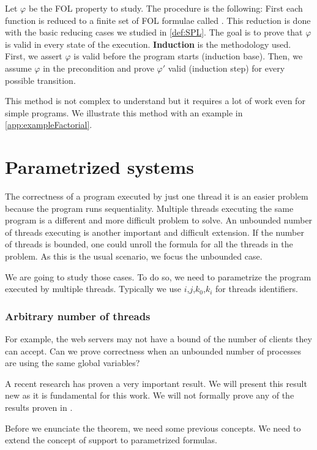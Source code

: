Let $\varphi$ be the \gls{FOL} property to study. 
%
The procedure is the following:
%
First each function is reduced to a finite set of \gls{FOL} formulae called .
%
This reduction is done with the basic reducing cases we studied in \ref{def:SPL}.
%
The goal is to prove that $\varphi$ is valid in every state of the execution.
%
\textbf{Induction} is the methodology used.
%
First, we assert $\varphi$ is valid before the program starts (induction base).
%
Then, we assume $\varphi$ in the precondition and prove $\varphi'$ valid (induction step) for every possible transition.

This method is not complex to understand but it requires a lot of work even for simple programs. 
%
We illustrate this method with an example in \ref{app:exampleFactorial}.


\section{Parametrized systems}

The correctness of a program executed by just one thread it is an easier problem because the program runs sequentiality.
%
Multiple threads executing the same program is a different and more difficult problem to solve.
%
An unbounded number of threads executing is another important and difficult extension.
%
If the number of threads is bounded, one could unroll the formula for all the threads in the problem. 
%
As this is the usual scenario, we focus the unbounded case.

We are going to study those cases. 
%
To do so, we need to parametrize the program executed by multiple threads.
%
Typically we use  $i$,$j$,$k_0$,$k_i$ for threads identifiers.
%
\subsubsection{Arbitrary number of threads}

For example, the web servers may not have a bound of the number of clients they can accept.
%
Can we prove correctness when an unbounded number of processes are using the same global variables?

A recent research  has proven a very important result. 
%
We will present this result new as it is fundamental for this work. 
%
We will not formally prove any of the results proven in \citep{paperParametrizedInvariants}.

Before we enunciate the theorem, we need some previous concepts.
%
We need to extend the concept of support to parametrized formulas.


